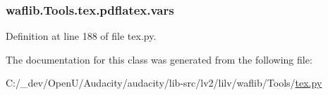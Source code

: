 \subsubsection[{\texorpdfstring{vars}{vars}}]{\setlength{\rightskip}{0pt plus 5cm}waflib.\+Tools.\+tex.\+pdflatex.\+vars\hspace{0.3cm}{\ttfamily [static]}}\hypertarget{classwaflib_1_1_tools_1_1tex_1_1pdflatex_a62ccd368b637f63992528146005c1a50}{}\label{classwaflib_1_1_tools_1_1tex_1_1pdflatex_a62ccd368b637f63992528146005c1a50}


Definition at line 188 of file tex.\+py.



The documentation for this class was generated from the following file\+:\begin{DoxyCompactItemize}
\item 
C\+:/\+\_\+dev/\+Open\+U/\+Audacity/audacity/lib-\/src/lv2/lilv/waflib/\+Tools/\hyperlink{lilv_2waflib_2_tools_2tex_8py}{tex.\+py}\end{DoxyCompactItemize}
